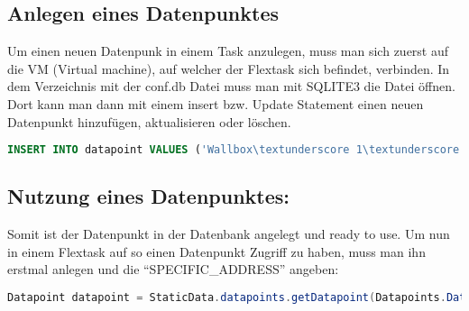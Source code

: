 \subsection{Anlegen eines Datenpunktes}


Um einen neuen Datenpunk in einem Task anzulegen, muss man sich zuerst auf die VM (Virtual machine),  auf welcher der Flextask sich befindet, verbinden. In dem Verzeichnis mit der conf.db Datei muss man mit SQLITE3 die Datei öffnen. Dort kann man dann mit einem insert bzw. Update Statement einen neuen Datenpunkt hinzufügen, aktualisieren oder löschen. 

\begin{lstlisting}[language=sql,caption=Example Element,label=lst:impl:foo]
    INSERT INTO datapoint VALUES ('Wallbox\textunderscore 1\textunderscore startCharching\textunderscore icon\textunderscore state',1,'','state\textunderscore [Wallbox\textunderscore 1\textunderscore startCharching\textunderscore icon]','','','INT',-1,-1,0.0,'');
\end{lstlisting}

\subsection{Nutzung eines Datenpunktes:}

Somit ist der Datenpunkt in der Datenbank angelegt und ready to use. Um nun in einem Flextask auf so einen Datenpunkt Zugriff zu haben, muss man ihn erstmal anlegen und die “SPECIFIC\_ADDRESS” angeben: 

\begin{lstlisting}[language=java,caption=Example Datapoint,label=lst:impl:foo]
    Datapoint datapoint = StaticData.datapoints.getDatapoint(Datapoints.DatapointField.SPECIFIC\textunderscore ADDRESS, "SPECIFIC\textunderscore ADDRESS\textunderscore DES\textunderscore DATENPUNKTES"); 
\end{lstlisting}

